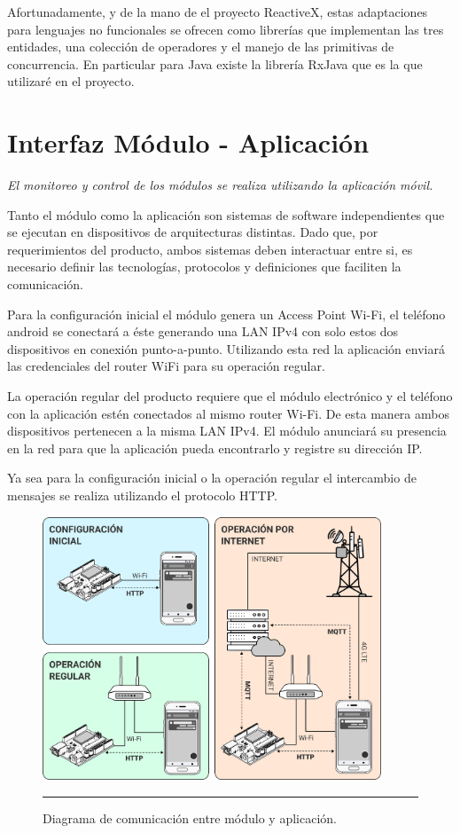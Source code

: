 Afortunadamente, y de la mano de el proyecto ReactiveX, estas adaptaciones para lenguajes no funcionales se ofrecen como librerías que implementan las tres entidades, una colección de operadores y el manejo de las primitivas de concurrencia. En particular para Java existe la librería RxJava que es la que utilizaré en el proyecto.



\section{Interfaz Módulo - Aplicación}
\label{section:interfaces}
\emph{El monitoreo y control de los módulos se realiza utilizando la aplicación móvil.}

Tanto el módulo como la aplicación son sistemas de software independientes que se ejecutan en dispositivos de arquitecturas distintas. Dado que, por requerimientos del producto, ambos sistemas deben interactuar entre si, es necesario definir las tecnologías, protocolos y definiciones que faciliten la comunicación.

Para la configuración inicial el módulo genera un Access Point Wi-Fi, el teléfono android se conectará a éste generando una LAN IPv4 con solo estos dos dispositivos en conexión punto-a-punto. Utilizando esta red la aplicación enviará las credenciales del router WiFi para su operación regular.

La operación regular del producto requiere que el módulo electrónico y el teléfono con la aplicación estén conectados al mismo router Wi-Fi. De esta manera ambos dispositivos pertenecen a la misma LAN IPv4. El módulo anunciará su presencia en la red para que la aplicación pueda encontrarlo y registre su dirección IP.

Ya sea para la configuración inicial o la operación regular el intercambio de mensajes se realiza utilizando el protocolo HTTP.

\begin{figure}[htbp]
	\centering
	\includegraphics[width=0.9\textwidth]{Figures/design/conect.png}
	\rule{35em}{1pt}
	\caption[Connection Diagram]{Diagrama de comunicación entre módulo y aplicación.}
	\label{fig:comunic_mod_app}
\end{figure}

